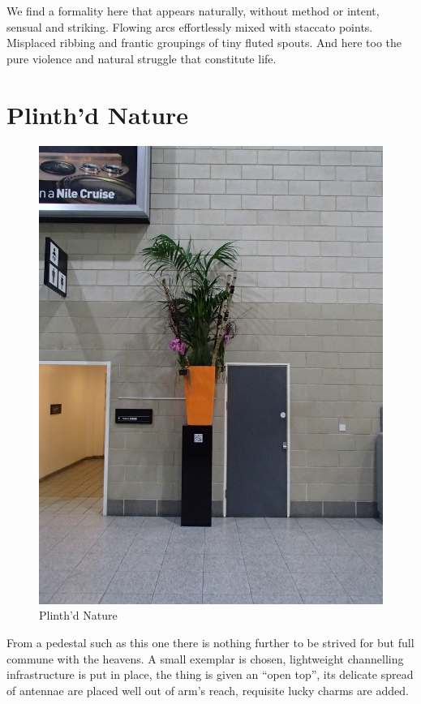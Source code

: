 \documentclass{article}
\begin{document}
We find a formality here that appears naturally, without method or intent,
sensual and striking. Flowing arcs effortlessly mixed with staccato points.
Misplaced ribbing and frantic groupings of tiny fluted spouts. And here too
the pure violence and natural struggle that constitute life.

\chapter{Plinth'd Nature}

\begin{figure}
\centering
\includegraphics[width=\textwidth,angle=90]{figures/P1050143.JPG}
\caption{Plinth'd Nature}
\end{figure}

From a pedestal such as this one there is nothing further to be strived for but
full commune with the heavens. A small exemplar is chosen, lightweight
channelling infrastructure is put in place, the thing is given an ``open top'',
its delicate spread of antennae are placed well out of arm's reach, requisite
lucky charms are added.
\end{document}
